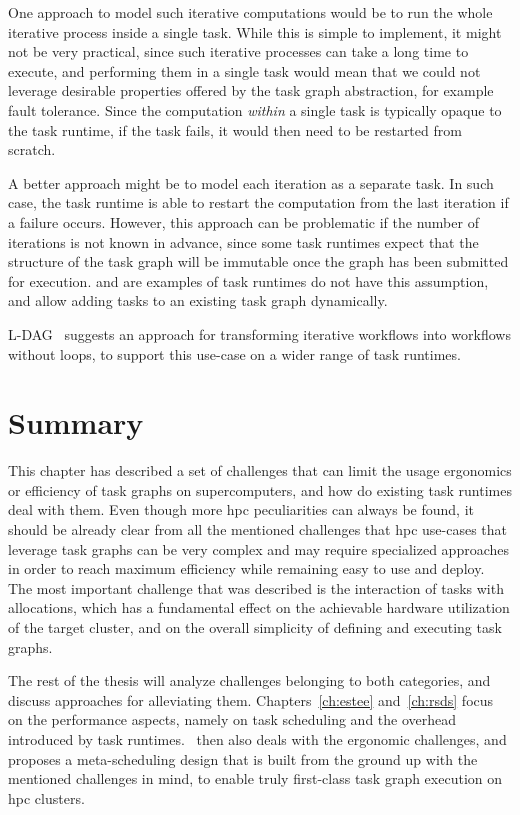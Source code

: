 \begin{description}[wide=0pt]
		One approach to model such iterative computations would be to run the whole iterative process
		inside a single task. While this is simple to implement, it might not be very practical, since such
		iterative processes can take a long time to execute, and performing them in a single task would
		mean that we could not leverage desirable properties offered by the task graph abstraction, for
		example fault tolerance. Since the computation \emph{within} a single task is typically
		opaque to the task runtime, if the task fails, it would then need to be restarted from scratch.

		A better approach might be to model each iteration as a separate task. In such case, the task
		runtime is able to restart the computation from the last iteration if a failure occurs. However,
		this approach can be problematic if the number of iterations is not known in advance, since some
		task runtimes expect that the structure of the task graph will be immutable once the graph has been
		submitted for execution. \dask{} and \ray{} are examples of task
		runtimes do not have this assumption, and allow adding tasks to an existing task graph dynamically.

		\textsc{L-DAG}~\cite{l-dag} suggests an approach for
		transforming iterative workflows into workflows without loops, to support this use-case on a wider
		range of task runtimes.
\end{description}

\section*{Summary}
This chapter has described a set of challenges that can limit the usage ergonomics or efficiency of
task graphs on supercomputers, and how do existing task runtimes deal with them. Even though more
\gls{hpc} peculiarities can always be found, it should be already clear from all the
mentioned challenges that \gls{hpc} use-cases that leverage task graphs can be very
complex and may require specialized approaches in order to reach maximum efficiency while remaining
easy to use and deploy. The most important challenge that was described is the interaction of tasks
with allocations, which has a fundamental effect on the achievable hardware utilization of the
target cluster, and on the overall simplicity of defining and executing task graphs.

The rest of the thesis will analyze challenges belonging to both categories, and discuss approaches
for alleviating them. Chapters~\ref{ch:estee} and~\ref{ch:rsds} focus on the
performance aspects, namely on task scheduling and the overhead introduced by task
runtimes.~ then also deals with the ergonomic challenges, and proposes a
meta-scheduling design that is built from the ground up with the mentioned challenges in mind, to
enable truly first-class task graph execution on \gls{hpc} clusters.

